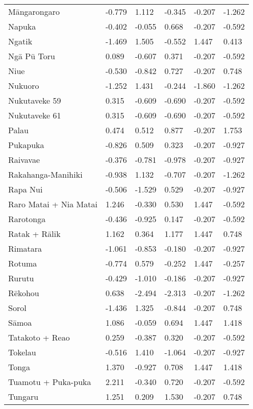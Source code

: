 \begin{longtable}{p{4.5cm}p{2cm}p{2cm}p{2cm}p{2cm}p{2cm}}
  Māngarongaro & -0.779 & 1.112 & -0.345 & -0.207 & -1.262 \\ 
  Napuka & -0.402 & -0.055 & 0.668 & -0.207 & -0.592 \\ 
  Ngatik & -1.469 & 1.505 & -0.552 & 1.447 & 0.413 \\ 
  Ngā Pū Toru & 0.089 & -0.607 & 0.371 & -0.207 & -0.592 \\ 
  Niue & -0.530 & -0.842 & 0.727 & -0.207 & 0.748 \\ 
  Nukuoro & -1.252 & 1.431 & -0.244 & -1.860 & -1.262 \\ 
  Nukutaveke 59 & 0.315 & -0.609 & -0.690 & -0.207 & -0.592 \\ 
  Nukutaveke 61 & 0.315 & -0.609 & -0.690 & -0.207 & -0.592 \\ 
  Palau & 0.474 & 0.512 & 0.877 & -0.207 & 1.753 \\ 
  Pukapuka & -0.826 & 0.509 & 0.323 & -0.207 & -0.927 \\ 
  Raivavae & -0.376 & -0.781 & -0.978 & -0.207 & -0.927 \\ 
  Rakahanga-Manihiki & -0.938 & 1.132 & -0.707 & -0.207 & -1.262 \\ 
  Rapa Nui & -0.506 & -1.529 & 0.529 & -0.207 & -0.927 \\ 
  Raro Matai + Nia Matai & 1.246 & -0.330 & 0.530 & 1.447 & -0.592 \\ 
  Rarotonga & -0.436 & -0.925 & 0.147 & -0.207 & -0.592 \\ 
  Ratak + Rālik & 1.162 & 0.364 & 1.177 & 1.447 & 0.748 \\ 
  Rimatara & -1.061 & -0.853 & -0.180 & -0.207 & -0.927 \\ 
  Rotuma & -0.774 & 0.579 & -0.252 & 1.447 & -0.257 \\ 
  Rurutu & -0.429 & -1.010 & -0.186 & -0.207 & -0.927 \\ 
  Rēkohou & 0.638 & -2.494 & -2.313 & -0.207 & -1.262 \\ 
  Sorol & -1.436 & 1.325 & -0.844 & -0.207 & 0.748 \\ 
  Sāmoa & 1.086 & -0.059 & 0.694 & 1.447 & 1.418 \\ 
  Tatakoto + Reao & 0.259 & -0.387 & 0.320 & -0.207 & -0.592 \\ 
  Tokelau & -0.516 & 1.410 & -1.064 & -0.207 & -0.927 \\ 
  Tonga & 1.370 & -0.927 & 0.708 & 1.447 & 1.418 \\ 
  Tuamotu + Puka-puka & 2.211 & -0.340 & 0.720 & -0.207 & -0.592 \\ 
  Tungaru & 1.251 & 0.209 & 1.530 & -0.207 & 0.748 \\ 

\end{longtable}
